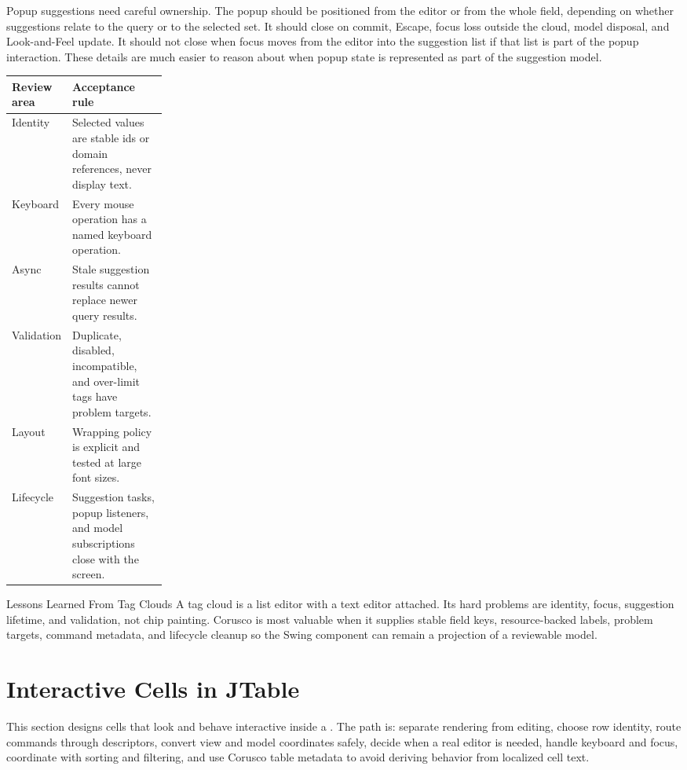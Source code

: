 Popup suggestions need careful ownership. The popup should be positioned from
the editor or from the whole field, depending on whether suggestions relate to
the query or to the selected set. It should close on commit, Escape, focus loss
outside the cloud, model disposal, and Look-and-Feel update. It should not close
when focus moves from the editor into the suggestion list if that list is part of
the popup interaction. These details are much easier to reason about when popup
state is represented as part of the suggestion model.

\begin{tabularx}{0.96\linewidth}{@{}p{0.23\linewidth}X@{}}
\toprule
Review area & Acceptance rule\\
\midrule
Identity & Selected values are stable ids or domain references, never display text.\\
Keyboard & Every mouse operation has a named keyboard operation.\\
Async & Stale suggestion results cannot replace newer query results.\\
Validation & Duplicate, disabled, incompatible, and over-limit tags have problem targets.\\
Layout & Wrapping policy is explicit and tested at large font sizes.\\
Lifecycle & Suggestion tasks, popup listeners, and model subscriptions close with the screen.\\
\bottomrule
\end{tabularx}

\begin{principlebox}{Lessons Learned From Tag Clouds}
A tag cloud is a list editor with a text editor attached. Its hard problems are
identity, focus, suggestion lifetime, and validation, not chip painting. Corusco
is most valuable when it supplies stable field keys, resource-backed labels,
problem targets, command metadata, and lifecycle cleanup so the Swing component
can remain a projection of a reviewable model.
\end{principlebox}

\section{Interactive Cells in JTable}

\begin{roadmapbox}
This section designs cells that look and behave interactive inside a
. The path is: separate rendering from editing, choose row identity,
route commands through descriptors, convert view and model coordinates safely,
decide when a real editor is needed, handle keyboard and focus, coordinate with
sorting and filtering, and use Corusco table metadata to avoid deriving behavior
from localized cell text.
\end{roadmapbox}


